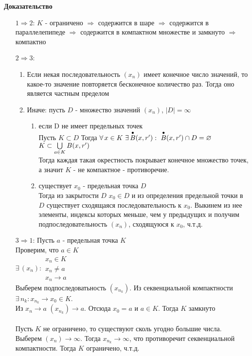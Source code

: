 \documentclass[12pt]{article}
\begin{document}
\textbf{Доказательство}
\begin{enumerate}
    \item[$1\Rightarrow 2$:] $K$ - ограничено $\Rightarrow$ содержится в шаре $\Rightarrow$ содержится в параллелепипеде $\Rightarrow$ содержится в компактном множестве и замкнуто $\Rightarrow$ компактно
    \item[$2\Rightarrow 3$:]
    \begin{enumerate}
        \item Если некая последовательность $(x_n)$ имеет конечное число значений, то какое-то значение повторяется бесконечное количество раз. Тогда оно является частным пределом
        \item Иначе: пусть $D$ - множество значений $(x_n)$, $|D| = \infty$
        \begin{enumerate}
            \item если D не имеет предельных точек\\
            Пусть $K\subset D$
            Тогда $\forall\,x\in K\ \exists\,\overdot{B}(x,r'):\ \overdot{B}(x,r')\cap D = \varnothing$\\
            $K \subset \bigcup\limits_{a\in K} B(x,r')$\\
            Тогда каждая такая окрестность покрывает конечное множество точек, а значит $K$ - не компактное - противоречие.
            \item существует $x_0$ - предельная точка $D$\\
            Тогда из закрытости $D$ $x_0\in D$ и из определения предельной точки в $D$ существует сходящаяся последовательность к $x_0$. Выкинем из нее элементы, индексы которых меньше, чем у предыдущих и получим подпоследовательность $(x_n)$, сходящуюся к $x_0$, ч.т.д.
        \end{enumerate}
    \end{enumerate}
    \item [$3\Rightarrow 1$:] Пусть $a$ - предельная точка $K$\\
    Проверим, что $a \in K$\\
    $\exists\,(x_n): \begin{array}{l}
         x_n\in K \\
         x_n \neq a \\
         x_n\rightarrow a
    \end{array}$\\
    Выберем подпоследоватьность $(x_{n_k})$. Из секвенциальной компактности $\exists\,n_k: x_{n_k} \rightarrow x_0 \in K$.\\
    Из $x_n\rightarrow a$ $(x_{n_k}) \rightarrow a$. Отсюда $x_0 = a$ и $a \in K$. Тогда $K$ замкнуто\\\\
    Пусть $K$ не ограничено, то существуют сколь угодно большие числа. Выберем $(x_n) \rightarrow \infty$. Тогда $x_{n_k}\rightarrow \infty$, что противоречит секвенциальной компактности. Тогда $K$ ограничено, ч.т.д.
\end{enumerate}
\end{document}
